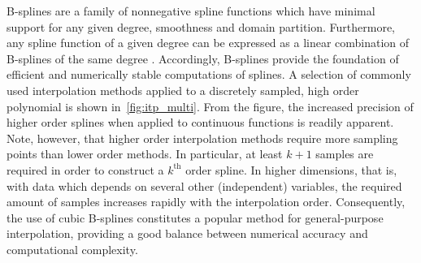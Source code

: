 

B-splines are a family of nonnegative spline functions which have minimal
support for any given degree, smoothness and domain partition. Furthermore, any
spline function of a given degree can be expressed as a linear combination
of B-splines of the same degree
\parencite[pp.107--110]{stoer2002introduction}. Accordingly, B-splines provide
the foundation of efficient and numerically stable computations of splines.
A selection of commonly used interpolation methods applied to a discretely
sampled, high order polynomial is shown in~\cref{fig:itp_multi}. From the
figure, the increased precision of higher order splines when applied to
continuous functions is readily apparent. Note, however, that higher order
interpolation methods require more sampling points than lower order methods.
In particular, at least $k+1$ samples are required in order to construct a
$k^{\text{th}}$ order spline. In higher dimensions, that is, with data which
depends on several other (independent) variables, the required amount of
samples increases rapidly with the interpolation order. Consequently, the use
of cubic B-splines constitutes a popular method for general-purpose
interpolation, providing a good balance between numerical accuracy and
computational complexity.

